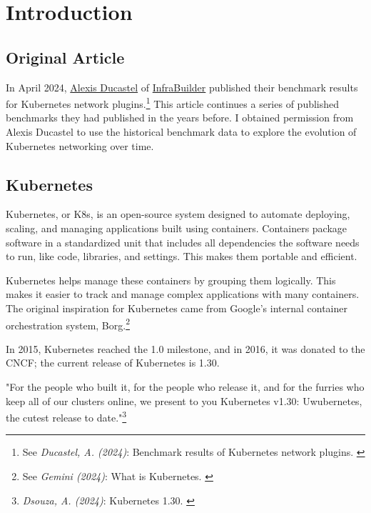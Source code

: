 %
%

\pagebreak
\section{Introduction}

\onehalfspacing

\subsection{Original Article}

In April 2024, \href{https://www.linkedin.com/in/alexisducastel/}{Alexis Ducastel} of \href{https://infrabuilder.com/}{InfraBuilder} published their benchmark results for Kubernetes network plugins.\footnote{See \textit{Ducastel, A. (2024)}: Benchmark results of Kubernetes network plugins. \cite{originalArticle}} This article continues a series of published benchmarks they had published in the years before. I obtained permission from Alexis Ducastel to use the historical benchmark data to explore the evolution of Kubernetes networking over time.

\subsection{Kubernetes}

Kubernetes, or K8s, is an open-source system designed to automate deploying, scaling, and managing applications built using containers. Containers package software in a standardized unit that includes all dependencies the software needs to run, like code, libraries, and settings. This makes them portable and efficient.

Kubernetes helps manage these containers by grouping them logically. This makes it easier to track and manage complex applications with many containers. The original inspiration for Kubernetes came from Google's internal container orchestration system, Borg.\footnote{See \textit{Gemini (2024)}: What is Kubernetes. \cite{bardKubernetes}} 

In 2015, Kubernetes reached the 1.0 milestone, and in 2016, it was donated to the CNCF; the current release of Kubernetes is 1.30.

"For the people who built it, for the people who release it, and for the furries who keep all of our clusters online, we present to you Kubernetes v1.30: Uwubernetes, the cutest release to date."\footnote{\textit{Dsouza, A. (2024)}: Kubernetes 1.30. \cite{uwubernetes}}


